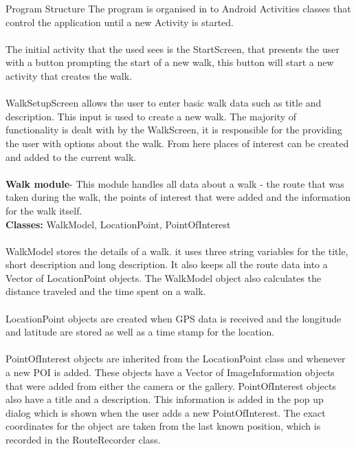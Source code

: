 \documentclass[12pt]{article}
\makeatletter
\renewcommand{\paragraph}{
  \@startsection{paragraph}{4}
  {\z@}{3.25ex \@plus -10em \@minus 1em}{0.1em}
  {\normalfont\normalsize\bfseries}
}
\makeatother
\begin{document}
\paragraph{Program Structure}
The program is organised in to Android Activities classes that control the application until a new Activity is started.
\\\\
The initial activity that the used sees is the StartScreen, that presents the user with a button prompting the start of a new walk, this button will start a new activity that creates the walk.
\\\\
WalkSetupScreen allows the user to enter basic walk data such as title and description. This input is used to create a new walk.
The majority of  functionality is dealt with by the WalkScreen, it is responsible for the providing the user with options about the walk. From here places of interest can be created and added to the current walk.
\\\\
\textbf{Walk module}- This module handles all data about a walk - the route that was taken during the walk, the points of interest that were added and the information for the walk itself.
~\\
\textbf{Classes:} WalkModel, LocationPoint, PointOfInterest~\\\\
WalkModel stores the details of a walk. it uses three string variables for the title, short description and long description. It also keeps all the route data into a Vector of LocationPoint objects. The WalkModel object also calculates the distance traveled and the time spent on a walk.
~\\\\
LocationPoint objects are created when GPS data is received and the longitude and latitude are stored as well as a time stamp for the location.
~\\\\
PointOfInterest objects are inherited from the LocationPoint class and whenever a new POI is added. These objects have a Vector of ImageInformation objects that were added from either the camera or the gallery. PointOfInterest objects also have a title and a description. This information is added in the pop up dialog which is shown when the user adds a new PointOfInterest. The exact coordinates for the object are taken from the last known position, which is recorded in the RouteRecorder class.
~\\\\
\end{document}
